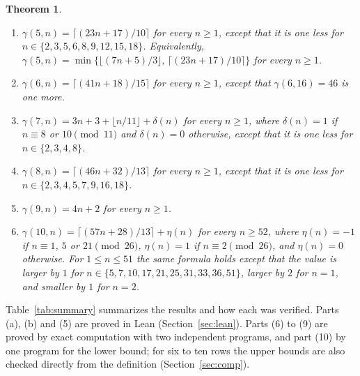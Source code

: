 \documentclass[12pt]{article}
\newcommand{\fl}[1]{\lfloor #1 \rfloor}
\newcommand{\ce}[1]{\lceil #1 \rceil}
\theoremstyle{plain}
\newtheorem{theorem}{Theorem}
\theoremstyle{remark}
\begin{document}
\begin{theorem}\label{thm:main}
\begin{enumerate}
\item[(5)] $\gamma(5,n)=\ce{(23n+17)/10}$ for every $n\ge1$, except that it is one less for
$n\in\{2,3,5,6,8,9,12,15,18\}$. Equivalently,
$\gamma(5,n)=\min\bigl\{\fl{(7n+5)/3},\,\ce{(23n+17)/10}\bigr\}$ for every $n\ge1$.
\item[(6)] $\gamma(6,n)=\ce{(41n+18)/15}$ for every $n\ge1$, except that $\gamma(6,16)=46$ is
one more.
\item[(7)] $\gamma(7,n)=3n+3+\fl{n/11}+\delta(n)$ for every $n\ge1$, where $\delta(n)=1$ if
$n\equiv8$ or $10\pmod{11}$ and $\delta(n)=0$ otherwise, except that it is one less for
$n\in\{2,3,4,8\}$.
\item[(8)] $\gamma(8,n)=\ce{(46n+32)/13}$ for every $n\ge1$, except that it is one less for
$n\in\{2,3,4,5,7,9,16,18\}$.
\item[(9)] $\gamma(9,n)=4n+2$ for every $n\ge1$.
\item[(10)] $\gamma(10,n)=\ce{(57n+28)/13}+\eta(n)$ for every $n\ge52$, where $\eta(n)=-1$
if $n\equiv1$, $5$ or $21\pmod{26}$, $\eta(n)=1$ if $n\equiv2\pmod{26}$, and $\eta(n)=0$
otherwise. For $1\le n\le51$ the same formula holds except that the value is larger by $1$ for
$n\in\{5,7,10,17,21,25,31,33,36,51\}$, larger by $2$ for $n=1$, and smaller by $1$ for $n=2$.
\end{enumerate}
\end{theorem}

Table~\ref{tab:summary} summarizes the results and how each was verified. Parts (a), (b) and
(5) are proved in Lean (Section~\ref{sec:lean}). Parts (6) to (9) are proved by exact
computation with two independent programs, and part (10) by one program for the lower bound;
for six to ten rows the upper bounds are also checked directly from the definition
(Section~\ref{sec:comp}).
\end{document}
